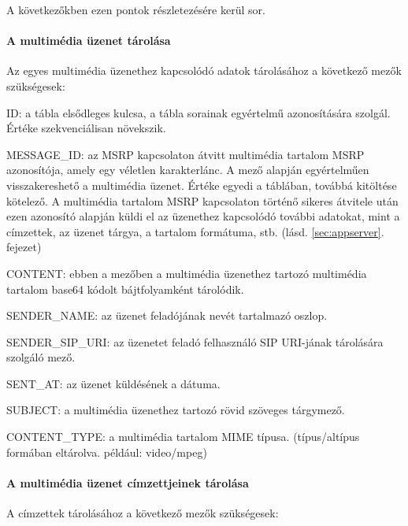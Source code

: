 A következőkben ezen pontok részletezésére kerül sor.

\paragraph*{A multimédia üzenet tárolása\\}

Az  egyes multimédia üzenethez kapcsolódó adatok tárolásához a következő mezők szükségesek:

\begin{mydescription}
\item[ID:] a tábla elsődleges kulcsa, a tábla sorainak egyértelmű azonosítására szolgál. Értéke szekvenciálisan növekszik.
\item[MESSAGE\_ID:] az MSRP kapcsolaton átvitt multimédia tartalom MSRP azonosítója, amely egy véletlen karakterlánc. A mező alapján egyértelműen visszakereshető a multimédia üzenet. Értéke egyedi a táblában, továbbá kitöltése kötelező. A multimédia tartalom MSRP kapcsolaton történő sikeres átvitele után ezen azonosító alapján küldi el az üzenethez kapcsolódó további adatokat, mint a címzettek, az üzenet tárgya, a tartalom formátuma, stb. (lásd. \ref{sec:appserver}.~ fejezet) 
\item[CONTENT:] ebben a mezőben a multimédia üzenethez tartozó multimédia tartalom base64 kódolt bájtfolyamként tárolódik.
\item[SENDER\_NAME:] az üzenet feladójának nevét tartalmazó oszlop.
\item[SENDER\_SIP\_URI:] az üzenetet feladó felhasználó SIP URI-jának tárolására szolgáló mező.
\item[SENT\_AT:] az üzenet küldésének a dátuma. 
\item[SUBJECT:] a multimédia üzenethez tartozó rövid szöveges tárgymező.
\item[CONTENT\_TYPE:] a multimédia tartalom MIME típusa. (típus/altípus formában eltárolva. például: video/mpeg)
\end{mydescription}
\medskip

\paragraph*{A multimédia üzenet címzettjeinek tárolása\\}

A címzettek tárolásához a következő mezők szükségesek:

